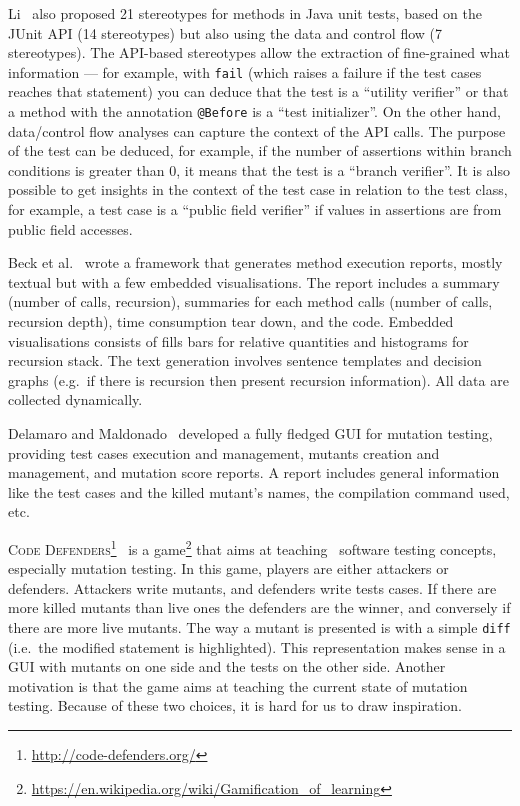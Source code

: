 \documentclass[a4paper,11pt]{sdm_internship}
\theoremstyle{definition}
\begin{document}
Li~\cite{li2018automatically} also proposed 21 stereotypes for methods in Java unit tests, based on the JUnit API (14 stereotypes) but also using the data and control flow (7 stereotypes).
The API-based stereotypes allow the extraction of fine-grained what information --- for example, with \texttt{fail} (which raises a failure if the test cases reaches that statement) you can deduce that the test is a ``utility verifier'' or that a method with the annotation \texttt{@Before} is a ``test initializer''.
On the other hand, data/control flow analyses can capture the context of the API calls.
The purpose of the test can be deduced, for example, if the number of assertions within branch conditions is greater than 0, it means that the test is a ``branch verifier''.
It is also possible to get insights in the context of the test case in relation to the test class, for example, a test case is a ``public field verifier'' if values in assertions are from public field accesses.

Beck et al.~\cite{beck2017method} wrote a framework that generates method execution reports, mostly textual but with a few embedded visualisations.
The report includes a summary (number of calls, recursion), summaries for each method calls (number of calls, recursion depth), time consumption tear down, and the code.
Embedded visualisations consists of fills bars for relative quantities and histograms for recursion stack.
The text generation involves sentence templates and decision graphs (e.g.\ if there is recursion then present recursion information).
All data are collected dynamically.

Delamaro and Maldonado~\cite{delamaro2001proteum} developed a fully fledged GUI for mutation testing, providing test cases execution and management, mutants creation and management, and mutation score reports.
A report includes general information like the test cases and the killed mutant's names, the compilation command used, etc.

\textsc{Code Defenders}\footnote{\url{http://code-defenders.org/}}~\cite{rojas2017code} is a game\footnote{\url{https://en.wikipedia.org/wiki/Gamification_of_learning}} that aims at teaching~\cite{clegg2017teaching} software testing concepts, especially mutation testing.
In this game, players are either attackers or defenders.
Attackers write mutants, and defenders write tests cases.
If there are more killed mutants than live ones the defenders are the winner, and conversely if there are more live mutants.
The way a mutant is presented is with a simple \texttt{diff} (i.e.\ the modified statement is highlighted).
This representation makes sense in a GUI with mutants on one side and the tests on the other side.
Another motivation is that the game aims at teaching the current state of mutation testing.
Because of these two choices, it is hard for us to draw inspiration.
\end{document}
